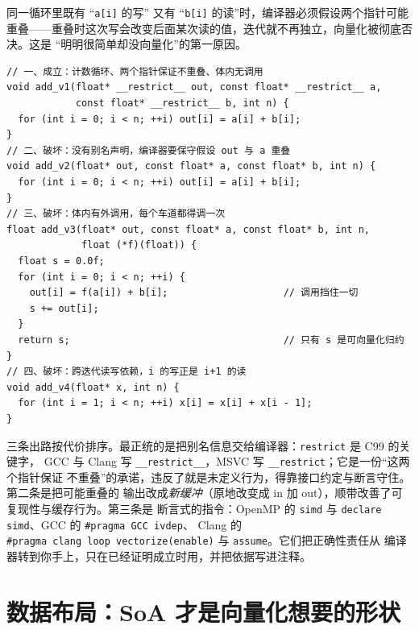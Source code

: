 \documentclass[12pt,a4paper,fontset=fandol]{ctexbook}
\newcommand{\Tp}[1]{\texttt{#1}}
\begin{document}
同一循环里既有 ``\Tp{a[i]} 的写'' 又有 ``\Tp{b[i]} 的读''时，编译器必须假设两个指针可能
重叠——重叠时这次写会改变后面某次读的值，迭代就不再独立，向量化被彻底否决。这是
``明明很简单却没向量化''的第一原因。
\begin{lstlisting}[style=cppstyle,caption={可自动向量化与它的三种破坏写法}]
// 一、成立：计数循环、两个指针保证不重叠、体内无调用
void add_v1(float* __restrict__ out, const float* __restrict__ a,
            const float* __restrict__ b, int n) {
  for (int i = 0; i < n; ++i) out[i] = a[i] + b[i];
}
// 二、破坏：没有别名声明，编译器要保守假设 out 与 a 重叠
void add_v2(float* out, const float* a, const float* b, int n) {
  for (int i = 0; i < n; ++i) out[i] = a[i] + b[i];
}
// 三、破坏：体内有外调用，每个车道都得调一次
float add_v3(float* out, const float* a, const float* b, int n,
             float (*f)(float)) {
  float s = 0.0f;
  for (int i = 0; i < n; ++i) {
    out[i] = f(a[i]) + b[i];                    // 调用挡住一切
    s += out[i];
  }
  return s;                                     // 只有 s 是可向量化归约
}
// 四、破坏：跨迭代读写依赖，i 的写正是 i+1 的读
void add_v4(float* x, int n) {
  for (int i = 1; i < n; ++i) x[i] = x[i] + x[i - 1];
}
\end{lstlisting}
三条出路按代价排序。最正统的是把别名信息交给编译器：\Tp{restrict} 是 C99 的关键字，
GCC 与 Clang 写 \Tp{\_\_restrict\_\_}，MSVC 写 \Tp{\_\_restrict}；它是一份``这两个指针保证
不重叠''的承诺，违反了就是未定义行为，得靠接口约定与断言守住。第二条是把可能重叠的
输出改成\emph{新缓冲}（原地改变成 in 加 out），顺带改善了可复现性与缓存行为。第三条是
断言式的指令：OpenMP 的 \Tp{simd} 与 \Tp{declare simd}、GCC 的 \Tp{\#pragma\ GCC\ ivdep}、
Clang 的 \Tp{\#pragma\ clang\ loop\ vectorize(enable)} 与 \Tp{assume}。它们把正确性责任从
编译器转到你手上，只在已经证明成立时用，并把依据写进注释。

\section{数据布局：SoA 才是向量化想要的形状}
\end{document}
